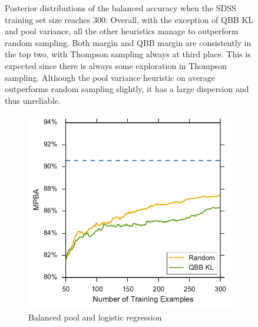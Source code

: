 \begin{figure}[p]
\begin{subfigure}{\textwidth}
	\end{subfigure}
	\caption[Violin plots of balanced accuracy (SDSS)]{Posterior distributions of the balanced
        accuracy when the SDSS training set size reaches 300: Overall, with the exception of QBB KL
        and pool variance, all the other heuristics manage to outperform random sampling. Both margin and
        QBB margin are consistently in the top two, with Thompson sampling always at third place. This is
        expected since there is always some exploration in Thompson sampling. Although the pool variance
        heuristic on average outperforms random sampling slightly, it has a large dispersion and thus
        unreliable.} \label{fig:sdss_bl_ind}
\end{figure}


\begin{figure}[p]
	\centering
	\begin{subfigure}{.5\textwidth}
		\centering
		\includegraphics[width=\textwidth]{figures/5_active/sdss_bl_ind_lower}
		\caption{Balanced pool and logistic regression}
		\label{fig:sdss_bl_ind_lower}
	\end{subfigure}%
	\begin{subfigure}{.5\textwidth}
		\centering

\end{subfigure}
\end{figure}
